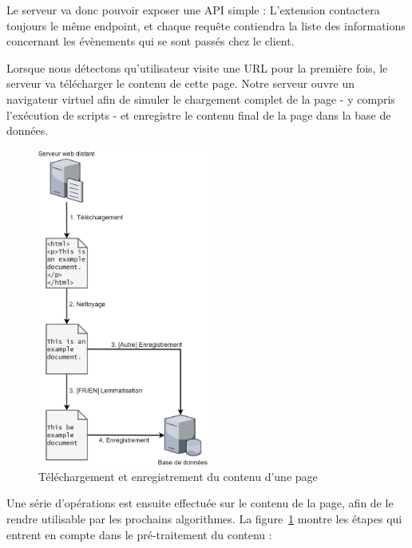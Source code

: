 				Le serveur va donc pouvoir exposer une API simple : L'extension contactera toujours le même endpoint, et chaque requête contiendra la liste des informations concernant les évènements qui se sont passés chez le client.

				Lorsque nous détectons qu'utilisateur visite une URL pour la première fois, le serveur va télécharger le contenu de cette page. Notre serveur ouvre un navigateur virtuel afin de simuler le chargement complet de la page - y compris l'exécution de scripts - et enregistre le contenu final de la page dans la base de données.

				\begin{figure}[!h]
					\centering
					\includegraphics[width=0.5\textwidth]{images/design/data1_big}
					\caption{Téléchargement et enregistrement du contenu d'une page}
					\label{d-download-page}
				\end{figure}

				Une série d'opérations est ensuite effectuée sur le contenu de la page, afin de le rendre utilisable par les prochains algorithmes. La figure~\ref{d-download-page} montre les étapes qui entrent en compte dans le pré-traitement du contenu :

